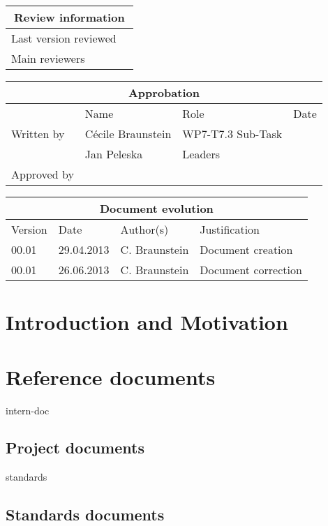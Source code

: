 \documentclass{openetcs_article}
\begin{document}
\begin{tabular}{|p{4.4cm}|p{8.7cm}|}
\hline
\multicolumn{2}{|c|}{Review information} \\
\hline
Last version reviewed &  \\
\hline
Main reviewers & \\
\hline
\end{tabular}

\begin{tabular}{|p{2.2cm}|p{4cm}|p{4cm}|p{2cm}|}
\hline
\multicolumn{4}{|c|}{Approbation} \\
\hline
  &  Name & Role & Date   \\
\hline  
Written by    &  Cécile Braunstein & WP7-T7.3 Sub-Task  & \\
& Jan Peleska & Leaders&\\
\hline
Approved by & &  & \\
\hline
\end{tabular}

\begin{tabular}{|p{2.2cm}|p{2cm}|p{3cm}|p{5cm}|}
\hline
\multicolumn{4}{|c|}{Document evolution} \\
\hline
Version &  Date & Author(s) & Justification  \\
\hline  
00.01 & 29.04.2013 & C. Braunstein  &  Document creation  \\
00.01 & 26.06.2013 & C. Braunstein  &  Document correction  \\
\hline  
\end{tabular}
\newpage


\printglossary
\mainmatter
\section{Introduction and Motivation}


\section{Reference documents}


\begin{btSect}{intern-doc}
\subsection{Project documents}
\btPrintAll
\end{btSect}
\begin{btSect}{standards}
\subsection{Standards documents}
\btPrintAll
\end{btSect}
\end{document}
